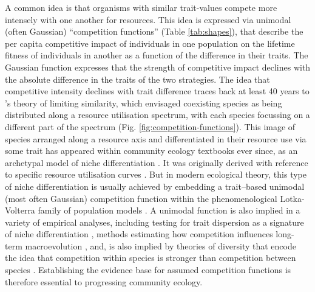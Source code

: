 \documentclass[a4paper,11pt]{article}
\begin{document}
A common idea is that organisms with similar trait-values compete more intensely with one another for resources. This idea is expressed via unimodal (often Gaussian) ``competition functions'' (Table \ref{tab:shapes}), that describe the per capita competitive impact of individuals in one population on the lifetime fitness of individuals in another as a function of the difference in their traits. The Gaussian function expresses that the strength of competitive impact declines with the absolute difference in the traits of the two strategies. The idea that competitive intensity declines with trait difference traces back at least 40 years to \citet{MacArthur-1967}’s theory of limiting similarity, which envisaged coexisting species as being distributed along a resource utilisation spectrum, with each species focussing on a different part of the spectrum (Fig. \ref{fig:competition-functions}). This image of species arranged along a resource axis and differentiated in their resource use via some trait has appeared within community ecology textbooks ever since, as an archetypal model of niche differentiation \citep[e.g.,][]{Krebs-1972, Ricklefs-1973, Ricklefs-1999, Krebs-2013}. It was originally derived with reference to specific resource utilisation curves \citep{MacArthur-1967, Roughgarden-1979}. But in modern ecological theory, this type of niche differentiation is usually achieved by embedding a trait--based unimodal (most often Gaussian) competition function within the phenomenological Lotka-Volterra family of population models \citep{Taper-1985, Case-2000, Dieckmann-1999, Leimar-2013, DAndrea-2019}. A unimodal function is also implied in a variety of empirical analyses, including testing for trait dispersion as a signature of niche differentiation \citep{Kraft-2008, Adler-2013, Maire-2012}, methods estimating how competition influences long-term macroevolution \citep{Schluter-2000a, Harmon-2019, 
Fraser-2020a}, and, is also implied by theories of diversity that encode the idea that competition within species is stronger than competition between species \citep{Chesson-2000, Scheffer-2006}. Establishing the evidence base for assumed competition functions is therefore essential to progressing community ecology.
\end{document}
